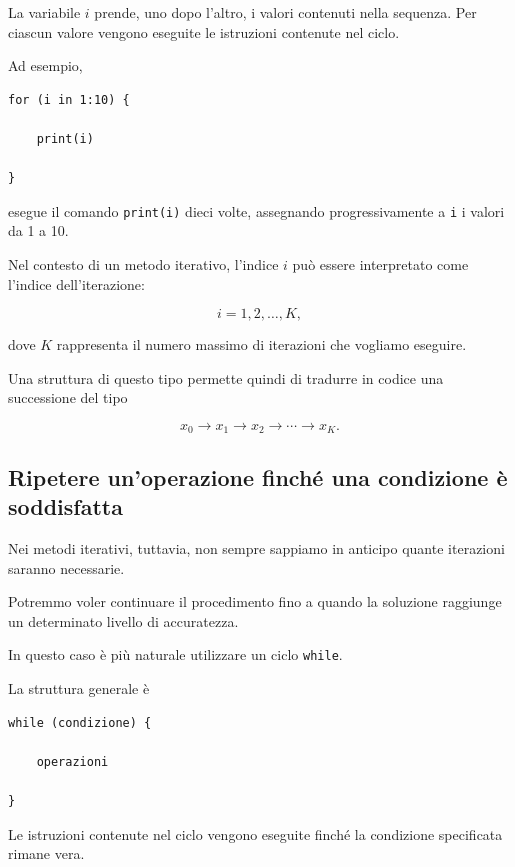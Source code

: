 La variabile $i$ prende, uno dopo l'altro, i valori contenuti nella
sequenza. Per ciascun valore vengono eseguite le istruzioni
contenute nel ciclo.

Ad esempio,

\begin{verbatim}
for (i in 1:10) {

    print(i)

}
\end{verbatim}

esegue il comando \texttt{print(i)} dieci volte, assegnando
progressivamente a \texttt{i} i valori da 1 a 10.

Nel contesto di un metodo iterativo, l'indice $i$ può essere
interpretato come l'indice dell'iterazione:

\begin{equation*}
    i=1,2,\ldots,K,
\end{equation*}

dove $K$ rappresenta il numero massimo di iterazioni che vogliamo
eseguire.

Una struttura di questo tipo permette quindi di tradurre in codice
una successione del tipo

\begin{equation*}
    x_0
    \longrightarrow
    x_1
    \longrightarrow
    x_2
    \longrightarrow
    \cdots
    \longrightarrow
    x_K.
\end{equation*}


\subsection{Ripetere un'operazione finché una condizione è soddisfatta}

Nei metodi iterativi, tuttavia, non sempre sappiamo in anticipo
quante iterazioni saranno necessarie.

Potremmo voler continuare il procedimento fino a quando la soluzione
raggiunge un determinato livello di accuratezza.

In questo caso è più naturale utilizzare un ciclo \texttt{while}.

La struttura generale è

\begin{verbatim}
while (condizione) {

    operazioni

}
\end{verbatim}

Le istruzioni contenute nel ciclo vengono eseguite finché la
condizione specificata rimane vera.

